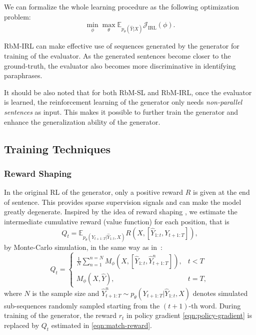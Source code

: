 \documentclass[11pt,a4paper]{article}
\newcommand{\MP}{M_{\phi}}
\begin{document}
    We can formalize the whole learning procedure as the following optimization problem:
        \begin{equation}\label{eqn:irl}
          \min_{\phi} \max_{\theta} \mathbb{E}_{p_{\theta}(\hat{Y}|X)} \mathcal{J}_{\text{IRL}}(\phi).
        \end{equation}

    RbM-IRL can make effective use of sequences generated by the generator for training of the evaluator. As the generated sentences become closer to the ground-truth, the evaluator also becomes more discriminative in identifying paraphrases.

    It should be also noted that for both RbM-SL and RbM-IRL, once the evaluator is learned, the reinforcement learning of the generator only needs \textit{non-parallel sentences} as input. This makes it possible to further train the generator and enhance the generalization ability of the generator.

    \subsection{Training Techniques}\label{sec:training-techniques}
    \subsubsection*{Reward Shaping}\label{sec:reward-shaping}
    In the original RL of the generator, only a positive reward $R$ is given at the end of sentence. This provides sparse supervision signals and can make the model greatly degenerate. Inspired by the idea of reward shaping \citep{ng1999policy,bahdanau2016actor}, we estimate the intermediate cumulative reward (value function) for each position, that is
    \[
        Q_t=\mathbb{E}_{p_{\theta}(Y_{t+1:T}|\hat{Y}_{1:t},X)} R(X, [\hat{Y}_{1:t},Y_{t+1:T}]),
    \]
    by Monte-Carlo simulation, in the same way as in~\citet{yu2017seqgan}:
    \begin{equation} \label{eqn:match-reward}
        Q_t =
            \begin{cases}
                \frac{1}{N}\sum_{n=1}^{n=N}\MP(X, [\hat{Y}_{1:t}, \widehat{Y}_{t+1:T}^n]), & t < T\\
                \MP(X, \hat{Y}), & t = T,
            \end{cases}
    \end{equation}
    where $N$ is the sample size and $\widehat{Y}_{t+1:T}^n \sim p_{\theta}(Y_{t+1:T}|\hat{Y}_{1:t},X)$ denotes simulated sub-sequences randomly sampled starting from the $(t+1)$-th word. During training of the generator, the reward $r_t$ in policy gradient \eqref{eqn:policy-gradient} is replaced by $Q_t$ estimated in \eqref{eqn:match-reward}.
\end{document}
